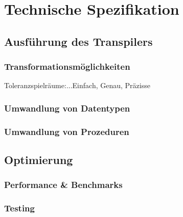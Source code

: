 \section{Technische Spezifikation}
	\subsection{Ausführung des Transpilers}
		\subsubsection{Transformationsmöglichkeiten}
		Toleranzspielräume:...Einfach, Genau, Präzisse
		\subsubsection{Umwandlung von Datentypen}
		\subsubsection{Umwandlung von Prozeduren}
	\subsection{Optimierung}
		\subsubsection{Performance & Benchmarks}
		\subsubsection{Testing}

